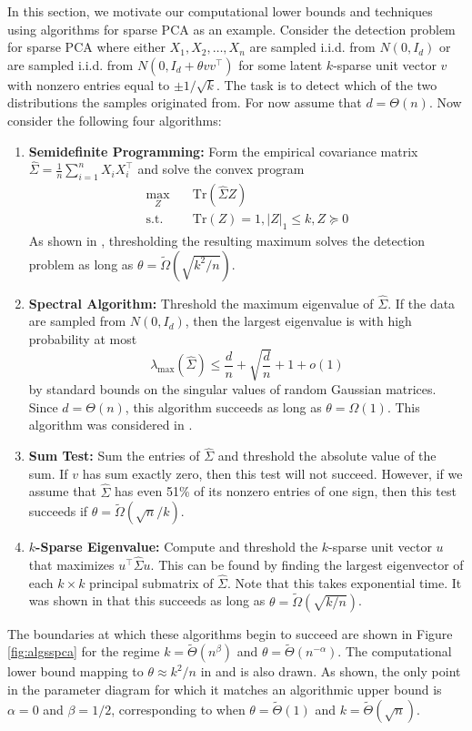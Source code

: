 In this section, we motivate our computational lower bounds and techniques using algorithms for sparse PCA as an example. Consider the detection problem for sparse PCA where either $X_1, X_2, \dots, X_n$ are sampled i.i.d. from $N(0, I_d)$ or are sampled i.i.d. from $N(0, I_d + \theta vv^\top)$ for some latent $k$-sparse unit vector $v$ with nonzero entries equal to $\pm 1/\sqrt{k}$. The task is to detect which of the two distributions the samples originated from. For now assume that $d = \Theta(n)$. Now consider the following four algorithms:
\begin{enumerate}
\item \textbf{Semidefinite Programming:} Form the empirical covariance matrix $\hat{\Sigma} = \frac{1}{n} \sum_{i = 1}^n X_i X_i^\top$ and solve the convex program
\begin{align*}
\max_Z \quad &\text{Tr}\left(\hat{\Sigma} Z\right) \\
\text{s.t.} \quad &\text{Tr}(Z) = 1, |Z|_1 \le k, Z \succeq 0
\end{align*}
As shown in \cite{berthet2013complexity}, thresholding the resulting maximum solves the detection problem as long as $\theta = \tilde{\Omega}(\sqrt{k^2/n})$.
\item \textbf{Spectral Algorithm:} Threshold the maximum eigenvalue of $\hat{\Sigma}$. If the data are sampled from $N(0, I_d)$, then the largest eigenvalue is with high probability at most
$$\lambda_{\text{max}}(\hat{\Sigma}) \le \frac{d}{n} + \sqrt{\frac{d}{n}} + 1 + o(1)$$
by standard bounds on the singular values of random Gaussian matrices. Since $d = \Theta(n)$, this algorithm succeeds as long as $\theta = \Omega(1)$. This algorithm was considered in \cite{krauthgamer2015semidefinite}.
\item \textbf{Sum Test:} Sum the entries of $\hat{\Sigma}$ and threshold the absolute value of the sum. If $v$ has sum exactly zero, then this test will not succeed. However, if we assume that $\hat{\Sigma}$ has even 51\% of its nonzero entries of one sign, then this test succeeds if $\theta = \tilde{\Omega}(\sqrt{n}/k)$.
\item \textbf{$k$-Sparse Eigenvalue:} Compute and threshold the $k$-sparse unit vector $u$ that maximizes $u^\top \hat{\Sigma} u$. This can be found by finding the largest eigenvector of each $k \times k$ principal submatrix of $\hat{\Sigma}$. Note that this takes exponential time. It was shown in \cite{berthet2013complexity} that this succeeds as long as $\theta = \tilde{\Omega}(\sqrt{k/n})$.
\end{enumerate}
The boundaries at which these algorithms begin to succeed are shown in Figure \ref{fig:algsspca} for the regime $k = \tilde{\Theta}(n^\beta)$ and $\theta = \tilde{\Theta}(n^{-\alpha})$. The computational lower bound mapping to $\theta \approx k^2/n$ in \cite{berthet2013complexity} and \cite{gao2017sparse} is also drawn. As shown, the only point in the parameter diagram for which it matches an algorithmic upper bound is $\alpha = 0$ and $\beta = 1/2$, corresponding to when $\theta = \tilde{\Theta}(1)$ and $k = \tilde{\Theta}(\sqrt{n})$.


